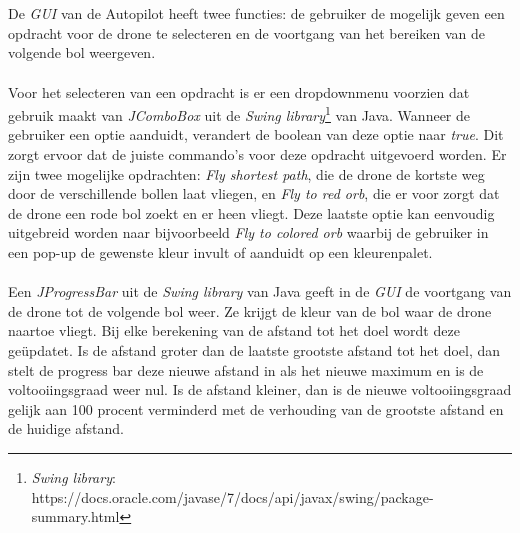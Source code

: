 \\
\\
De \textit{GUI} van de Autopilot heeft twee functies: de gebruiker de mogelijk geven een opdracht voor de drone te selecteren en de voortgang van het bereiken van de volgende bol weergeven.
\\
\\
Voor het selecteren van een opdracht is er een dropdownmenu voorzien dat gebruik maakt van \textit{JComboBox} uit de \textit{Swing library}\footnote{\textit{Swing library}: https://docs.oracle.com/javase/7/docs/api/javax/swing/package-summary.html} van Java. Wanneer de gebruiker een optie aanduidt, verandert de boolean van deze optie naar \textit{true}. Dit zorgt ervoor dat de juiste commando's voor deze opdracht uitgevoerd worden. Er zijn twee mogelijke opdrachten: \textit{Fly shortest path}, die de drone de kortste weg door de verschillende bollen laat vliegen, en \textit{Fly to red orb}, die er voor zorgt dat de drone een rode bol zoekt en er heen vliegt. Deze laatste optie kan eenvoudig uitgebreid worden naar bijvoorbeeld \textit{Fly to colored orb} waarbij de gebruiker in een pop-up de gewenste kleur invult of aanduidt op een kleurenpalet. 
\\
\\
Een \textit{JProgressBar} uit de \textit{Swing library} van Java geeft in de \textit{GUI} de voortgang van de drone tot de volgende bol weer. Ze krijgt de kleur van de bol waar  de drone naartoe vliegt. Bij elke berekening van de afstand tot het doel wordt deze ge\"{u}pdatet. Is de afstand groter dan de laatste grootste afstand tot het doel, dan stelt de progress bar deze nieuwe afstand in als het nieuwe maximum en is de voltooiingsgraad weer nul. Is de afstand kleiner, dan is de nieuwe voltooiingsgraad gelijk aan 100 procent verminderd met de verhouding van de grootste afstand en de huidige afstand.  
